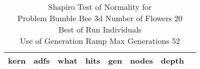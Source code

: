\begin{table}[H]
\caption{Shapiro Test of Normality for \\ Problem  Bumble Bee 3d  Number of Flowers 20\\Best of Run Individuals \\ Use of Generation Ramp  Max Generations 52\\}
\begin{center}
\scalebox{0.8} %
{
\begin{tabular}{lrrrrrrr}
\hline
kern & adfs & what & hits & gen & nodes & depth \\
\hline


\end{tabular}
}
\end{center}
\end{table}

